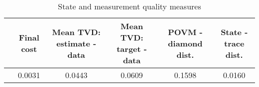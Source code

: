\begin{table}[h!]
\centering
\caption{State and measurement quality measures}
\begin{tabular}{c|c|c|c|c|c}
\toprule
 & Final cost & Mean TVD: estimate - data & Mean TVD: target - data & POVM - diamond dist. & State - trace dist. \\
\midrule
 & 0.0031 & 0.0443 & 0.0609 & 0.1598 & 0.0160 \\
\bottomrule
\end{tabular}
\end{table}
